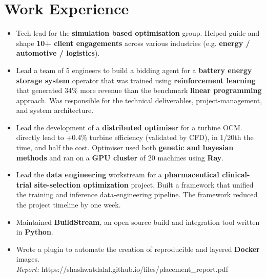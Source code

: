 \documentclass[a4paper]{deedy-resume} %
\begin{document}
\section{Work Experience}
\begin{itemize}
    \item Tech lead for the \textbf{simulation based optimisation} group. Helped guide and shape \textbf{10+ client engagements} across various industries (e.g. \textbf{energy / automotive / logistics}). 
    \item Lead a team of 5 engineers to build a bidding agent for a \textbf{battery energy storage system} operator that was trained using \textbf{reinforcement learning} that generated 34\% more revenue than the benchmark \textbf{linear programming} approach. Was responsible for the technical deliverables, project-management, and system architecture.
    \item Lead the development of a \textbf{distributed optimiser} for a turbine OCM. directly lead to +0.4\% turbine efficiency (validated by CFD), in 1/20th the time, and half the cost. Optimiser used both \textbf{genetic and bayesian methods} and ran on a \textbf{GPU cluster} of 20 machines using \textbf{Ray}. 
    \item Lead the \textbf{data engineering} workstream for a \textbf{pharmaceutical clinical-trial site-selection optimization} project. Built a framework that unified the training and inference data-engineering pipeline. The framework reduced the project timeline by one week.
\end{itemize} 
\begin{itemize}
    \item Maintained \textbf{BuildStream}, an open source build and integration tool written in \textbf{Python}.
    \item Wrote a plugin to automate the creation of reproducible and layered \textbf{Docker} images.
    \\
    \textit{Report:} https://shashwatdalal.github.io/files/placement\_report.pdf \\
\end{itemize}
\end{document}
